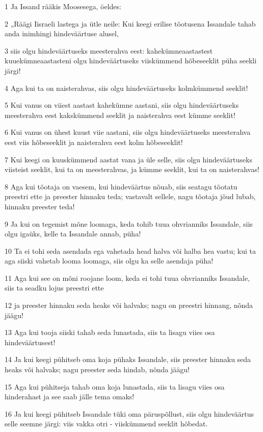 \par 1 Ja Issand rääkis Moosesega, öeldes:
\par 2 „Räägi Iisraeli lastega ja ütle neile: Kui keegi erilise tõotusena Issandale tahab anda inimhingi hindeväärtuse alusel,
\par 3 siis olgu hindeväärtuseks meesterahva eest: kahekümneaastastest kuuekümneaastasteni olgu hindeväärtuseks viiskümmend hõbeseeklit püha seekli järgi!
\par 4 Aga kui ta on naisterahvas, siis olgu hindeväärtuseks kolmkümmend seeklit!
\par 5 Kui vanus on viiest aastast kahekümne aastani, siis olgu hindeväärtuseks meesterahva eest kakskümmend seeklit ja naisterahva eest kümme seeklit!
\par 6 Kui vanus on ühest kuust viie aastani, siis olgu hindeväärtuseks meesterahva eest viis hõbeseeklit ja naisterahva eest kolm hõbeseeklit!
\par 7 Kui keegi on kuuskümmend aastat vana ja üle selle, siis olgu hindeväärtuseks viisteist seeklit, kui ta on meesterahvas, ja kümme seeklit, kui ta on naisterahvas!
\par 8 Aga kui tõotaja on vaesem, kui hindeväärtus nõuab, siis seatagu tõotatu preestri ette ja preester hinnaku teda; vastavalt sellele, nagu tõotaja jõud lubab, hinnaku preester teda!
\par 9 Ja kui on tegemist mõne loomaga, keda tohib tuua ohvrianniks Issandale, siis olgu igaüks, kelle ta Issandale annab, püha!
\par 10 Ta ei tohi seda asendada ega vahetada head halva või halba hea vastu; kui ta aga siiski vahetab looma loomaga, siis olgu ka selle asendaja püha!
\par 11 Aga kui see on mõni roojane loom, keda ei tohi tuua ohvrianniks Issandale, siis ta seadku lojus preestri ette
\par 12 ja preester hinnaku seda heaks või halvaks; nagu on preestri hinnang, nõnda jäägu!
\par 13 Aga kui tooja siiski tahab seda lunastada, siis ta lisagu viies osa hindeväärtusest!
\par 14 Ja kui keegi pühitseb oma koja pühaks Issandale, siis preester hinnaku seda heaks või halvaks; nagu preester seda hindab, nõnda jäägu!
\par 15 Aga kui pühitseja tahab oma koja lunastada, siis ta lisagu viies osa hinderahast ja see saab jälle tema omaks!
\par 16 Ja kui keegi pühitseb Issandale tüki oma päruspõllust, siis olgu hindeväärtus selle seemne järgi: viis vakka otri - viiskümmend seeklit hõbedat.
